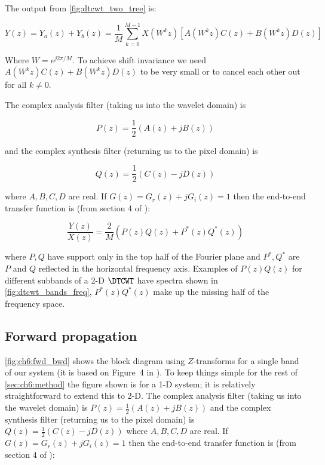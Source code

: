 The output from \autoref{fig:dtcwt_two_tree} is:

$$ Y(z) = Y_a(z) + Y_b(z) = \frac{1}{M}\sum_{k=0}^{M-1} X\left(W^k z\right)
  \left[ A\left(W^kz\right)C(z) + B\left(W^kz\right)D(z) \right] $$

Where $W=e^{j2\pi/M}$.  To achieve shift invariance we need 
$A\left(W^kz\right)C(z) + B\left(W^kz\right)D(z)$ to be very small or to cancel
each other out for all $k \neq 0$.

The complex analysis filter (taking us into the wavelet domain) is 

$$P(z) = \frac{1}{2}\left(A(z)+jB(z)\right)$$

and the complex synthesis filter (returning us to the pixel domain) is 

$$Q(z) = \frac{1}{2}\left(C(z) - jD(z)\right)$$

where $A,B,C,D$ are real.  If $G(z) = G_r(z) + jG_i(z) = 1$ then the end-to-end
transfer function is (from section 4 of \cite{kingsbury_complex_2001}):

\begin{equation}\label{eq:end_to_end1}
\frac{Y(z)}{X(z)} = \frac{2}{M}\left(P(z)Q(z) + P^*(z)Q^*(z)\right)
\end{equation}

where $P, Q$ have support only in the top half of the Fourier plane and $P^*,
Q^*$ are $P$ and $Q$ reflected in the horizontal frequency axis. Examples of
$P(z)Q(z)$ for different subbands of a 2-D $\DTCWT$ have spectra shown in
\autoref{fig:dtcwt_bands_freq}, $P^*(z)Q^*(z)$ make up the missing half of the
frequency space.\\



\subsection{Forward propagation}
\autoref{fig:ch6:fwd_bwd} shows the block diagram using $Z$-transforms for
a single band of our system (it is based on Figure~4 in
\cite{kingsbury_complex_2001}). To keep things simple for the rest of
\autoref{sec:ch6:method} the figure shown is for a 1-D system; it is relatively
straightforward to extend this to 2-D\cite{selesnick_dual-tree_2005}. The
complex analysis filter (taking us into the wavelet domain) is $P(z)
= \frac{1}{2}\left(A(z)+jB(z)\right)$ and the complex synthesis filter
(returning us to the pixel domain) is $Q(z) = \frac{1}{2}\left(C(z)
  - jD(z)\right)$ where $A,B,C,D$ are real.  If $G(z) = G_r(z) + jG_i(z) = 1$
  then the end-to-end transfer function is (from section 4 of
\cite{kingsbury_complex_2001}):


